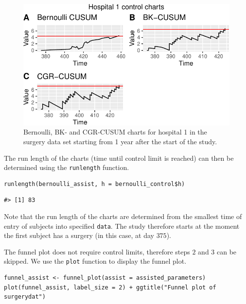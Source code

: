 \begin{figure}
\centering
\includegraphics{RJ-2023-095_files/figure-latex/assisted-plots-pdf-1.pdf}
\caption{\label{fig:assisted-plots-pdf}Bernoulli, BK- and CGR-CUSUM charts for hospital 1 in the surgery data set starting from 1 year after the start of the study.}
\end{figure}

The run length of the charts (time until control limit is reached) can then be determined using the \texttt{runlength} function.

\begin{verbatim}
runlength(bernoulli_assist, h = bernoulli_control$h)
\end{verbatim}

\begin{verbatim}
#> [1] 83
\end{verbatim}

Note that the run length of the charts are determined from the smallest time of entry of subjects into specified \texttt{data}. The study therefore starts at the moment the first subject has a surgery (in this case, at day \(375\)).

The funnel plot does not require control limits, therefore steps \(2\) and \(3\) can be skipped. We use the \texttt{plot} function to display the funnel plot.

\begin{verbatim}
funnel_assist <- funnel_plot(assist = assisted_parameters)
plot(funnel_assist, label_size = 2) + ggtitle("Funnel plot of surgerydat")
\end{verbatim}

